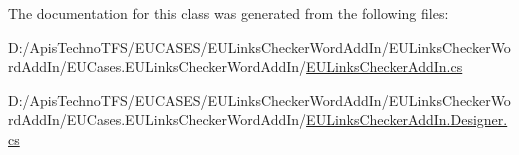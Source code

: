 The documentation for this class was generated from the following files\+:\begin{DoxyCompactItemize}
\item 
D\+:/\+Apis\+Techno\+T\+F\+S/\+E\+U\+C\+A\+S\+E\+S/\+E\+U\+Links\+Checker\+Word\+Add\+In/\+E\+U\+Links\+Checker\+Word\+Add\+In/\+E\+U\+Cases.\+E\+U\+Links\+Checker\+Word\+Add\+In/\hyperlink{_e_u_links_checker_add_in_8cs}{E\+U\+Links\+Checker\+Add\+In.\+cs}\item 
D\+:/\+Apis\+Techno\+T\+F\+S/\+E\+U\+C\+A\+S\+E\+S/\+E\+U\+Links\+Checker\+Word\+Add\+In/\+E\+U\+Links\+Checker\+Word\+Add\+In/\+E\+U\+Cases.\+E\+U\+Links\+Checker\+Word\+Add\+In/\hyperlink{_e_u_links_checker_add_in_8_designer_8cs}{E\+U\+Links\+Checker\+Add\+In.\+Designer.\+cs}\end{DoxyCompactItemize}
